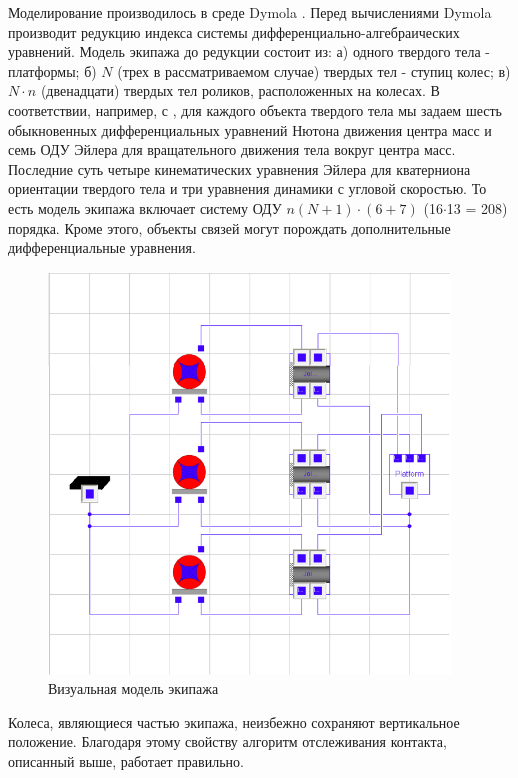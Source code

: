\documentclass[12pt]{article}
\begin{document}
Моделирование производилось в среде Dymola \cite{DymolaMan}. Перед вычислениями Dymola производит редукцию индекса системы дифферен\-циально\--алгебраичес\-ких уравнений. Модель экипажа до редукции состоит из: а) одного твердого тела - платформы; б) $N$ (трех в рассматриваемом случае) твердых тел - ступиц колес; в) $N\cdot n$ (двенадцати) твердых тел роликов, расположенных на колесах. В соответствии, например, с \cite{kos5}, для каждого объекта твердого тела мы задаем шесть обыкновенных дифференциальных уравнений Нютона движения центра масс и семь ОДУ Эйлера для вращательного движения тела вокруг центра масс. Последние суть четыре кинематических уравнения Эйлера для кватерниона ориентации твердого тела и три уравнения динамики с угловой скоростью. То есть модель экипажа включает систему ОДУ $n(N + 1) \cdot (6+7)$ (16$\cdot$13 = 208) порядка. Кроме этого, объекты связей могут порождать дополнительные дифференциальные уравнения.\\

\begin{figure}[h!]
    \centering
    \includegraphics[width=0.95\textwidth]{img/art/kos6_vehicle_model.png}
    \caption{Визуальная модель экипажа}
    \label{fig:kos6_vehicle_model}
\end{figure}

Колеса, являющиеся частью экипажа, неизбежно сохраняют вертикальное положение. Благодаря этому свойству алгоритм отслеживания контакта, описанный выше, работает правильно.\\
\end{document}
